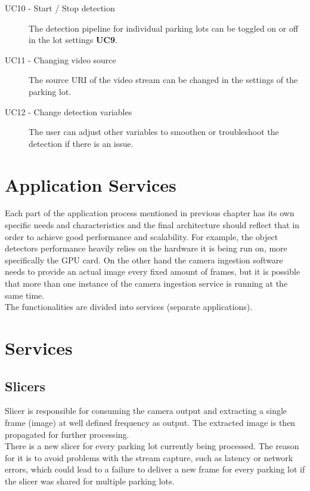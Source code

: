 \documentclass[thesis=M,english]{FITthesis}[2019/03/06]
\begin{document}
\begin{description}
    \item[UC10 - Start / Stop detection]
    The detection pipeline for individual parking lots can be toggled on or off in the lot settings \textbf{UC9}.
    
    \item [UC11 - Changing video source]
    The source URI of the video stream can be changed in the settings of the parking lot.
    
    \item[UC12 - Change detection variables]
    The user can adjust other variables to smoothen or troubleshoot the detection if there is an issue.
    
    
    \end{description}

\section{Application Services}
Each part of the application process mentioned in previous chapter has its own specific needs and characteristics and the final architecture should reflect that in order to achieve good performance and scalability. For example, the object detectors performance heavily relies on the hardware it is being run on, more specifically the GPU card. On the other hand the camera ingestion software needs to provide an actual image every fixed amount of frames, but it is possible that more than one instance of the camera ingestion service is running at the same time. \\

The functionalities are divided into services (separate applications).

\section{Services}
\subsection{Slicers}
Slicer is responsible for consuming the camera output and extracting a single frame (image) at well defined frequency as output. The extracted image is then propagated for further processing.\\

There is a new slicer for every parking lot currently being processed. The reason for it is to avoid problems with the stream capture, such as latency or network errors, which could lead to a failure to deliver a new frame for every parking lot if the slicer was shared for multiple parking lots. \\
\end{document}
